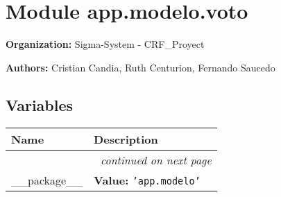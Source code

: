 %
%
%


\section{Module app.modelo.voto}

    \label{app:modelo:voto}
\textbf{Organization:} Sigma-System - CRF\_Proyect



\textbf{Authors:}
Cristian Candia,
    Ruth Centurion,
    Fernando Saucedo



  \subsection{Variables}

    \vspace{-1cm}
\hspace{\varindent}\begin{longtable}{|p{\varnamewidth}|p{\vardescrwidth}|l}
\cline{1-2}
\cline{1-2} \centering \textbf{Name} & \centering \textbf{Description}& \\
\cline{1-2}
\endhead\cline{1-2}\multicolumn{3}{r}{\small\textit{continued on next page}}\\\endfoot\cline{1-2}
\endlastfoot\raggedright \_\-\_\-p\-a\-c\-k\-a\-g\-e\-\_\-\_\- & \raggedright \textbf{Value:} 
{\tt \texttt{'}\texttt{app.modelo}\texttt{'}}&\\
\cline{1-2}
\end{longtable}



